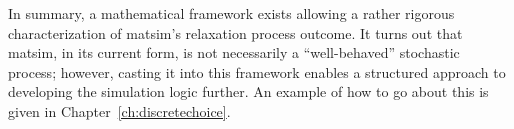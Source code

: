 
In summary, a mathematical framework exists allowing a rather
rigorous characterization of \gls{matsim}'s relaxation process outcome.
It turns out that \gls{matsim}, in its current form, is not necessarily a ``well-behaved''
stochastic process; however, casting it into this framework enables a structured
approach to developing the simulation logic further. An example of how to go
about this is given in Chapter~\ref{ch:discretechoice}.





